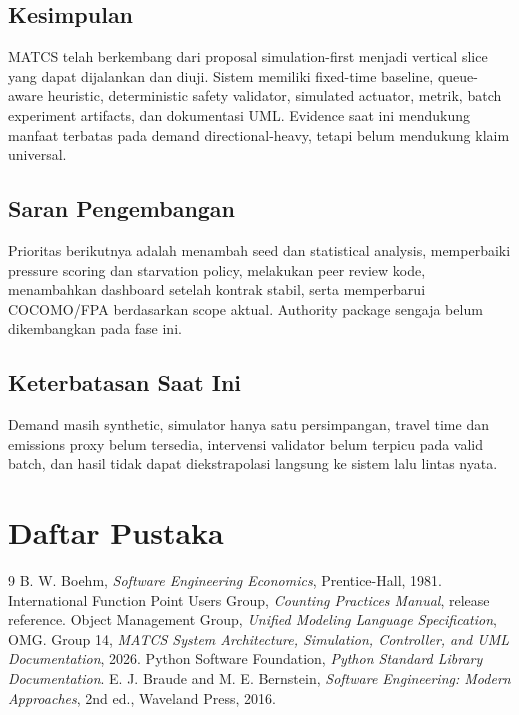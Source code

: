 \documentclass[12pt]{article}
\begin{document}
\subsection{Kesimpulan}
MATCS telah berkembang dari proposal simulation-first menjadi vertical slice yang dapat dijalankan dan diuji. Sistem memiliki fixed-time baseline, queue-aware heuristic, deterministic safety validator, simulated actuator, metrik, batch experiment artifacts, dan dokumentasi UML. Evidence saat ini mendukung manfaat terbatas pada demand directional-heavy, tetapi belum mendukung klaim universal.

\subsection{Saran Pengembangan}
Prioritas berikutnya adalah menambah seed dan statistical analysis, memperbaiki pressure scoring dan starvation policy, melakukan peer review kode, menambahkan dashboard setelah kontrak stabil, serta memperbarui COCOMO/FPA berdasarkan scope aktual. Authority package sengaja belum dikembangkan pada fase ini.

\subsection{Keterbatasan Saat Ini}
Demand masih synthetic, simulator hanya satu persimpangan, travel time dan emissions proxy belum tersedia, intervensi validator belum terpicu pada valid batch, dan hasil tidak dapat diekstrapolasi langsung ke sistem lalu lintas nyata.

\section*{Daftar Pustaka}
\begin{thebibliography}{9}
 B. W. Boehm, \textit{Software Engineering Economics}, Prentice-Hall, 1981.
 International Function Point Users Group, \textit{Counting Practices Manual}, release reference.
 Object Management Group, \textit{Unified Modeling Language Specification}, OMG.
 Group 14, \textit{MATCS System Architecture, Simulation, Controller, and UML Documentation}, 2026.
 Python Software Foundation, \textit{Python Standard Library Documentation}.
 E. J. Braude and M. E. Bernstein, \textit{Software Engineering: Modern Approaches}, 2nd ed., Waveland Press, 2016.
\end{thebibliography}
\end{document}

